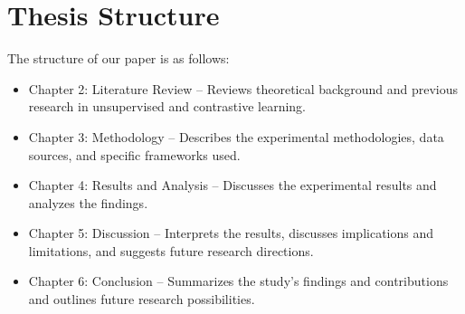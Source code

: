 \section{Thesis Structure}
The structure of our paper is as follows:

\begin{itemize}
    \item Chapter 2: Literature Review – Reviews theoretical background and previous research in unsupervised and contrastive learning.
    \item Chapter 3: Methodology – Describes the experimental methodologies, data sources, and specific frameworks used.
    \item Chapter 4: Results and Analysis – Discusses the experimental results and analyzes the findings.
    \item Chapter 5: Discussion – Interprets the results, discusses implications and limitations, and suggests future research directions.
    \item Chapter 6: Conclusion – Summarizes the study's findings and contributions and outlines future research possibilities.
\end{itemize}